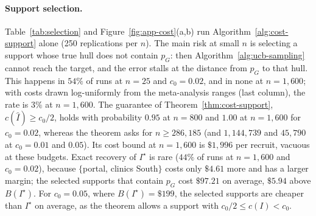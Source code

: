 \documentclass[twoside]{article}
\begin{document}
\paragraph{Support selection.} Table~\ref{tab:selection} and
Figure~\ref{fig:app-cost}(a,b) run Algorithm~\ref{alg:cost-support} alone
(250 replications per \(n\)). The main risk at small \(n\) is selecting a
support whose true hull does not contain \(p_G\): then
Algorithm~\ref{alg:ucb-sampling} cannot reach the target, and the error
stalls at the distance from \(p_G\) to that hull. This happens in
\(54\%\) of runs at \(n=25\) and \(c_0=0.02\), and in none at
\(n=1{,}600\); with costs drawn log-uniformly from the meta-analysis ranges
(last column), the rate is \(3\%\) at \(n=1{,}600\). The guarantee of
Theorem~\ref{thm:cost-support}, \(c(\widehat I)\ge c_0/2\), holds with
probability \(0.95\) at \(n=800\) and \(1.00\) at \(n=1{,}600\) for
\(c_0=0.02\), whereas the theorem asks for \(n\ge286{,}185\) (and
\(1{,}144{,}739\) and \(45{,}790\) at \(c_0=0.01\) and \(0.05\)). Its cost
bound at \(n=1{,}600\) is \(\$1{,}996\) per recruit, vacuous at these
budgets. Exact recovery of \(I^\star\) is rare (\(44\%\) of runs at
\(n=1{,}600\) and \(c_0=0.02\)), because \(\{\)portal, clinics South\(\}\)
costs only \(\$4.61\) more and has a larger margin; the selected supports
that contain \(p_G\) cost \(\$97.21\) on average, \(\$5.94\) above
\(B(I^\star)\). For \(c_0=0.05\), where \(B(I^\star)=\$199\), the selected
supports are cheaper than \(I^\star\) on average, as the theorem allows a
support with \(c_0/2\le c(I)<c_0\).
\end{document}
